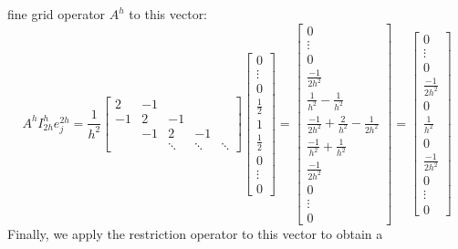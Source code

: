 \documentclass[11pt]{article}
\begin{document}
fine grid operator \(A^h\) to this vector: \[
A^h I_{2h}^h e_j^{2h} =
\frac{1}{h^2}
\begin{bmatrix}
  2 & -1  &    &    & \\
  -1 & 2  & -1 &    & \\
     & -1 & 2  & -1 &  \\
     &    & \ddots & \ddots & \ddots
\end{bmatrix}
\begin{bmatrix}
  0 \\ \vdots \\ 0 \\ \frac{1}{2} \\ 1 \\ \frac{1}{2} \\ 0 \\ \vdots \\ 0
\end{bmatrix}
=
\begin{bmatrix}
  0 \\ \vdots \\ 0 \\ \frac{-1}{2h^2} \\ \frac{1}{h^2} - \frac{1}{h^2} \\ \frac{-1}{2h^2} + \frac{2}{h^2}
  - \frac{1}{2h^2} \\ \frac{-1}{h^2} + \frac{1}{h^2} \\ \frac{-1}{2h^2} \\ 0 \\ \vdots \\ 0
\end{bmatrix}
= \begin{bmatrix}
  0 \\ \vdots \\ 0 \\ \frac{-1}{2h^2} \\ 0 \\ \frac{1}{h^2} \\ 0 \\ \frac{-1}{2h^2} \\ 0 \\ \vdots \\ 0
\end{bmatrix}
\] Finally, we apply the restriction operator to this vector to obtain a
\end{document}
